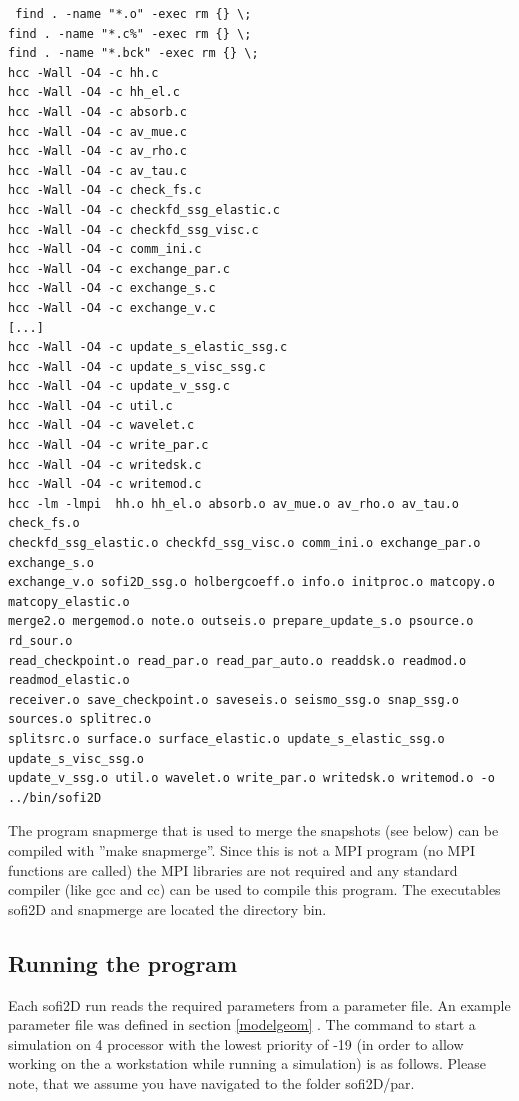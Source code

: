 \documentclass[11pt,onecolumn,oneside]{article}
\begin{document}
\begin{verbatim}
 find . -name "*.o" -exec rm {} \;
find . -name "*.c%" -exec rm {} \;
find . -name "*.bck" -exec rm {} \;
hcc -Wall -O4 -c hh.c
hcc -Wall -O4 -c hh_el.c
hcc -Wall -O4 -c absorb.c
hcc -Wall -O4 -c av_mue.c
hcc -Wall -O4 -c av_rho.c
hcc -Wall -O4 -c av_tau.c
hcc -Wall -O4 -c check_fs.c
hcc -Wall -O4 -c checkfd_ssg_elastic.c
hcc -Wall -O4 -c checkfd_ssg_visc.c
hcc -Wall -O4 -c comm_ini.c
hcc -Wall -O4 -c exchange_par.c
hcc -Wall -O4 -c exchange_s.c
hcc -Wall -O4 -c exchange_v.c
[...]
hcc -Wall -O4 -c update_s_elastic_ssg.c
hcc -Wall -O4 -c update_s_visc_ssg.c
hcc -Wall -O4 -c update_v_ssg.c
hcc -Wall -O4 -c util.c
hcc -Wall -O4 -c wavelet.c
hcc -Wall -O4 -c write_par.c
hcc -Wall -O4 -c writedsk.c
hcc -Wall -O4 -c writemod.c
hcc -lm -lmpi  hh.o hh_el.o absorb.o av_mue.o av_rho.o av_tau.o check_fs.o 
checkfd_ssg_elastic.o checkfd_ssg_visc.o comm_ini.o exchange_par.o exchange_s.o 
exchange_v.o sofi2D_ssg.o holbergcoeff.o info.o initproc.o matcopy.o matcopy_elastic.o 
merge2.o mergemod.o note.o outseis.o prepare_update_s.o psource.o rd_sour.o 
read_checkpoint.o read_par.o read_par_auto.o readdsk.o readmod.o readmod_elastic.o 
receiver.o save_checkpoint.o saveseis.o seismo_ssg.o snap_ssg.o sources.o splitrec.o 
splitsrc.o surface.o surface_elastic.o update_s_elastic_ssg.o update_s_visc_ssg.o 
update_v_ssg.o util.o wavelet.o write_par.o writedsk.o writemod.o -o ../bin/sofi2D
\end{verbatim}

The program snapmerge that is used to merge the snapshots (see below) can be compiled with ''make snapmerge''. Since this is not a MPI program (no MPI functions are called) the MPI libraries are not required and any standard compiler (like gcc and cc) can be used to compile this program. The executables sofi2D and snapmerge are located the directory bin.

\subsection{Running the program}\label{compexec1} 
Each sofi2D run reads the required parameters from a parameter file. An example parameter file was defined in section \ref{modelgeom} . The command to start a simulation on 4 processor with the lowest priority of -19 (in order to allow working on the a workstation while running a simulation) is as follows. Please note, that we assume you have navigated to the folder sofi2D/par.
\end{document}
